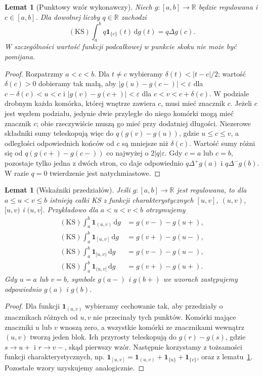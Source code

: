 \documentclass[11pt,a4paper]{article}
\numberwithin{equation}{section}
\theoremstyle{plain}
\newtheorem{lemat}[twierdzenie]{Lemat}
\theoremstyle{definition}
\theoremstyle{remark}
\newcommand{\R}{\mathbb R}
\newcommand{\ind}[1]{\mathbf 1_{#1}}
\newcommand{\KS}{\mathrm{KS}}
\begin{document}
\begin{lemat}[Punktowy wzór wykonawczy]
\label{lem:ks-point}
Niech $g:[a,b]\to\R$ będzie regulowana i $c\in[a,b]$. Dla dowolnej liczby $q\in\R$ zachodzi
\[
 (\KS)\int_a^b q\ind{\{c\}}(t)\,\mathrm dg(t)=q\Delta g(c).
\]
W szczególności wartość funkcji podcałkowej w punkcie skoku nie może być pomijana.
\end{lemat}
\begin{proof}
Rozpatrzmy $a<c<b$. Dla $t\ne c$ wybieramy $\delta(t)<|t-c|/2$; wartość $\delta(c)>0$ dobieramy tak małą, aby $|g(u)-g(c-)|<\varepsilon$ dla $c-\delta(c)<u<c$ i $|g(v)-g(c+)|<\varepsilon$ dla $c<v<c+\delta(c)$. W podziale drobnym każda komórka, której wnętrze zawiera $c$, musi mieć znacznik $c$. Jeżeli $c$ jest węzłem podziału, jedynie dwie przyległe do niego komórki mogą mieć znacznik $c$; obie rzeczywiście muszą go mieć przy dodatniej długości. Niezerowe składniki sumy teleskopują więc do $q(g(v)-g(u))$, gdzie $u\le c\le v$, a odległości odpowiednich końców od $c$ są mniejsze niż $\delta(c)$. Wartość sumy różni się od $q(g(c+)-g(c-))$ co najwyżej o $2|q|\varepsilon$. Gdy $c=a$ lub $c=b$, pozostaje tylko jedna z dwóch stron, co daje odpowiednio $q\Delta^+g(a)$ i $q\Delta^-g(b)$. W razie $q=0$ twierdzenie jest natychmiastowe.
\end{proof}

\begin{lemat}[Wskaźniki przedziałów]
\label{lem:ks-indicators}
Jeśli $g:[a,b]\to\R$ jest regulowana, to dla $a\le u<v\le b$ istnieją całki KS z funkcji charakterystycznych $[u,v]$, $(u,v)$, $[u,v)$ i $(u,v]$. Przykładowo dla $a<u<v<b$ otrzymujemy
\[
 \begin{aligned}
 (\KS)\int_a^b\ind{(u,v)}\,\mathrm dg&=g(v-)-g(u+),\\
 (\KS)\int_a^b\ind{[u,v]}\,\mathrm dg&=g(v+)-g(u-),\\
 (\KS)\int_a^b\ind{[u,v)}\,\mathrm dg&=g(v-)-g(u-),\\
 (\KS)\int_a^b\ind{(u,v]}\,\mathrm dg&=g(v+)-g(u+).
 \end{aligned}
\]
Gdy $u=a$ lub $v=b$, symbole $g(a-)$ i $g(b+)$ we wzorach zastępujemy odpowiednio $g(a)$ i $g(b)$.
\end{lemat}
\begin{proof}
Dla funkcji $\ind{(u,v)}$ wybieramy cechowanie tak, aby przedziały o znacznikach różnych od $u,v$ nie przecinały tych punktów. Komórki mające znaczniki $u$ lub $v$ wnoszą zero, a wszystkie komórki ze znacznikami wewnątrz $(u,v)$ tworzą jeden blok. Ich przyrosty teleskopują do $g(r)-g(s)$, gdzie $s\to u+$ i $r\to v-$, skąd pierwszy wzór. Następnie korzystamy z tożsamości funkcji charakterystycznych, np. $\ind{[u,v]}=\ind{(u,v)}+\ind{\{u\}}+\ind{\{v\}}$, oraz z lematu~\ref{lem:ks-point}. Pozostałe wzory uzyskujemy analogicznie.
\end{proof}
\end{document}
